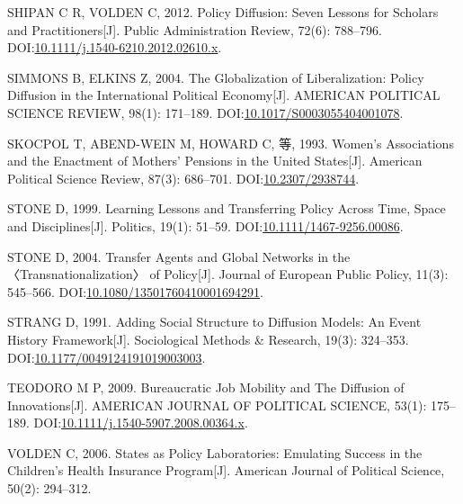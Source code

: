 \documentclass[
  12pt,
]{ctexart}
\newlength{\cslhangindent}
\newlength{\cslentryspacingunit} %
\newenvironment{CSLReferences}[2] %
 {%
  \setlength{\parindent}{0pt}
  \ifodd #1
  \let\oldpar\par
  \def\par{\hangindent=\cslhangindent\oldpar}
  \fi
  \setlength{\parskip}{#2\cslentryspacingunit}
 }%
 {}
\begin{document}
\begin{CSLReferences}{1}{0}
\leavevmode{}%
SHIPAN C R, VOLDEN C, 2012. Policy {Diffusion}: {Seven Lessons} for {Scholars} and {Practitioners}{[}J{]}. Public Administration Review, 72(6): 788--796. DOI:\href{https://doi.org/10.1111/j.1540-6210.2012.02610.x}{10.1111/j.1540-6210.2012.02610.x}.

\leavevmode{}%
SIMMONS B, ELKINS Z, 2004. The Globalization of Liberalization: {Policy} Diffusion in the International Political Economy{[}J{]}. AMERICAN POLITICAL SCIENCE REVIEW, 98(1): 171--189. DOI:\href{https://doi.org/10.1017/S0003055404001078}{10.1017/S0003055404001078}.

\leavevmode{}%
SKOCPOL T, ABEND-WEIN M, HOWARD C, 等, 1993. Women's {Associations} and the {Enactment} of {Mothers}' {Pensions} in the {United States}{[}J{]}. American Political Science Review, 87(3): 686--701. DOI:\href{https://doi.org/10.2307/2938744}{10.2307/2938744}.

\leavevmode{}%
STONE D, 1999. Learning {Lessons} and {Transferring Policy} Across {Time}, {Space} and {Disciplines}{[}J{]}. Politics, 19(1): 51--59. DOI:\href{https://doi.org/10.1111/1467-9256.00086}{10.1111/1467-9256.00086}.

\leavevmode{}%
STONE D, 2004. Transfer Agents and Global Networks in the {〈Transnationalization〉} of Policy{[}J{]}. Journal of European Public Policy, 11(3): 545--566. DOI:\href{https://doi.org/10.1080/13501760410001694291}{10.1080/13501760410001694291}.

\leavevmode{}%
STRANG D, 1991. Adding {Social Structure} to {Diffusion Models}: {An Event History Framework}{[}J{]}. Sociological Methods \& Research, 19(3): 324--353. DOI:\href{https://doi.org/10.1177/0049124191019003003}{10.1177/0049124191019003003}.

\leavevmode{}%
TEODORO M P, 2009. Bureaucratic {Job Mobility} and {The Diffusion} of {Innovations}{[}J{]}. AMERICAN JOURNAL OF POLITICAL SCIENCE, 53(1): 175--189. DOI:\href{https://doi.org/10.1111/j.1540-5907.2008.00364.x}{10.1111/j.1540-5907.2008.00364.x}.

\leavevmode{}%
VOLDEN C, 2006. States as {Policy Laboratories}: {Emulating Success} in the {Children}'s {Health Insurance Program}{[}J{]}. American Journal of Political Science, 50(2): 294--312.


\end{CSLReferences}
\end{document}
